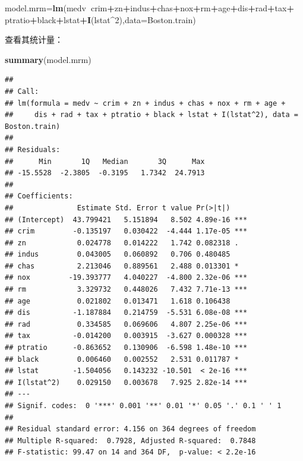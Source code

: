 \documentclass[UTF-8]{ctexart}
\newenvironment{Shaded}{\begin{snugshade}}{\end{snugshade}}
\newcommand{\DataTypeTok}[1]{\textcolor[rgb]{0.13,0.29,0.53}{#1}}
\newcommand{\DecValTok}[1]{\textcolor[rgb]{0.00,0.00,0.81}{#1}}
\newcommand{\KeywordTok}[1]{\textcolor[rgb]{0.13,0.29,0.53}{\textbf{#1}}}
\newcommand{\NormalTok}[1]{#1}
\newcommand{\OperatorTok}[1]{\textcolor[rgb]{0.81,0.36,0.00}{\textbf{#1}}}
\newcommand{\StringTok}[1]{\textcolor[rgb]{0.31,0.60,0.02}{#1}}
\begin{document}
\begin{Shaded}
	\begin{Highlighting}[]
\NormalTok{model.mrm=}\KeywordTok{lm}\NormalTok{(medv}\OperatorTok{~}\NormalTok{crim}\OperatorTok{+}\NormalTok{zn}\OperatorTok{+}\NormalTok{indus}\OperatorTok{+}\NormalTok{chas}\OperatorTok{+}\NormalTok{nox}\OperatorTok{+}\NormalTok{rm}\OperatorTok{+}\NormalTok{age}\OperatorTok{+}\NormalTok{dis}\OperatorTok{+}\NormalTok{rad}\OperatorTok{+}\NormalTok{tax}\OperatorTok{+}
\StringTok{               }\NormalTok{ptratio}\OperatorTok{+}\NormalTok{black}\OperatorTok{+}\NormalTok{lstat}\OperatorTok{+}\KeywordTok{I}\NormalTok{(lstat}\OperatorTok{^}\DecValTok{2}\NormalTok{),}\DataTypeTok{data=}\NormalTok{Boston.train)}
	\end{Highlighting}
\end{Shaded}

查看其统计量：

\begin{Shaded}
	\begin{Highlighting}[]
\KeywordTok{summary}\NormalTok{(model.mrm)}
	\end{Highlighting}
\end{Shaded}

\begin{verbatim}
## 
## Call:
## lm(formula = medv ~ crim + zn + indus + chas + nox + rm + age + 
##     dis + rad + tax + ptratio + black + lstat + I(lstat^2), data = Boston.train)
## 
## Residuals:
##      Min       1Q   Median       3Q      Max 
## -15.5528  -2.3805  -0.3195   1.7342  24.7913 
## 
## Coefficients:
##               Estimate Std. Error t value Pr(>|t|)    
## (Intercept)  43.799421   5.151894   8.502 4.89e-16 ***
## crim         -0.135197   0.030422  -4.444 1.17e-05 ***
## zn            0.024778   0.014222   1.742 0.082318 .  
## indus         0.043005   0.060892   0.706 0.480485    
## chas          2.213046   0.889561   2.488 0.013301 *  
## nox         -19.393777   4.040227  -4.800 2.32e-06 ***
## rm            3.329732   0.448026   7.432 7.71e-13 ***
## age           0.021802   0.013471   1.618 0.106438    
## dis          -1.187884   0.214759  -5.531 6.08e-08 ***
## rad           0.334585   0.069606   4.807 2.25e-06 ***
## tax          -0.014200   0.003915  -3.627 0.000328 ***
## ptratio      -0.863652   0.130906  -6.598 1.48e-10 ***
## black         0.006460   0.002552   2.531 0.011787 *  
## lstat        -1.504056   0.143232 -10.501  < 2e-16 ***
## I(lstat^2)    0.029150   0.003678   7.925 2.82e-14 ***
## ---
## Signif. codes:  0 '***' 0.001 '**' 0.01 '*' 0.05 '.' 0.1 ' ' 1
## 
## Residual standard error: 4.156 on 364 degrees of freedom
## Multiple R-squared:  0.7928, Adjusted R-squared:  0.7848 
## F-statistic: 99.47 on 14 and 364 DF,  p-value: < 2.2e-16
\end{verbatim}
\end{document}
